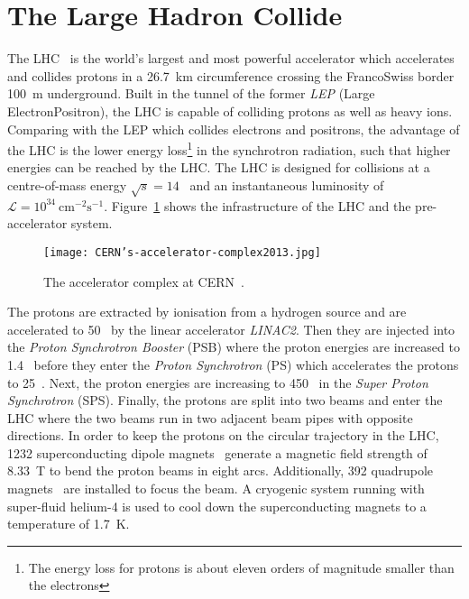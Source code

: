 
\section{The Large Hadron Collide}
\label{sec:ae_LHC}
The LHC~\cite{1748-0221-3-08-S08001} is the world's largest and most powerful accelerator which accelerates and collides protons in a 26.7~km circumference crossing the Franco\textendash Swiss border 100~m underground.
Built in the tunnel of the former \textit{LEP} (Large Electron\textendash Positron), the LHC is capable of colliding protons as well as heavy ions.
Comparing with the LEP which collides electrons and positrons, the advantage of the LHC is the lower energy loss\footnote{The energy loss for protons is about eleven orders of magnitude smaller than the electrons} in the synchrotron radiation, such that higher energies can be reached by the LHC.
The LHC is designed for collisions at a centre-of-mass energy $\sqrt{s}=14$~{\TeV} and an instantaneous luminosity of $\mathcal{L} =10^{34}~\textrm{cm}^{-2}\textrm{s}^{-1}$.
Figure~\ref{fig:ae_CERN_accelerator_complex} shows the infrastructure of the LHC and the pre-accelerator system.

\begin{figure}[htbp]
\begin{center}
\texttt{[image: CERN's-accelerator-complex2013.jpg]}
\caption{The accelerator complex at CERN~\cite{Marcastel:1621583}.}
\label{fig:ae_CERN_accelerator_complex}
\end{center}
\end{figure}

The protons are extracted by ionisation from a hydrogen source and are accelerated to 50~{\MeV} by the linear accelerator \textit{LINAC2}.
Then they are injected into the \textit{Proton Synchrotron Booster} (PSB) where the proton energies are increased to 1.4~{\GeV} before they enter the \textit{Proton Synchrotron} (PS) which accelerates the protons to 25~{\GeV}.
Next, the proton energies are increasing to 450~{\GeV} in the \textit{Super Proton Synchrotron} (SPS). 
Finally, the protons are split into two beams and enter the LHC where the two beams run in two adjacent beam pipes with opposite directions.
In order to keep the protons on the circular trajectory in the LHC, 1232 superconducting dipole magnets~\cite{1288863} generate a magnetic field strength of 8.33~T to bend the proton beams in eight arcs.
Additionally, 392 quadrupole magnets~\cite{1288863} are installed to focus the beam.
A cryogenic system running with super-fluid helium-4 is used to cool down the superconducting magnets to a temperature of 1.7~K.

